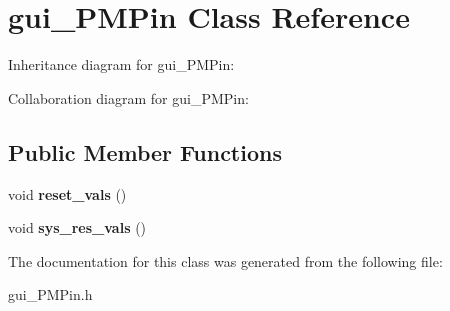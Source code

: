 \hypertarget{classgui__PMPin}{}\section{gui\+\_\+\+P\+M\+Pin Class Reference}
\label{classgui__PMPin}


Inheritance diagram for gui\+\_\+\+P\+M\+Pin\+:


Collaboration diagram for gui\+\_\+\+P\+M\+Pin\+:
\subsection*{Public Member Functions}
\begin{DoxyCompactItemize}
\item 
void {\bfseries reset\+\_\+vals} ()\hypertarget{classgui__PMPin_acb6cd63b4650c93e8b434f1ea4303b6a}{}\label{classgui__PMPin_acb6cd63b4650c93e8b434f1ea4303b6a}

\item 
void {\bfseries sys\+\_\+res\+\_\+vals} ()\hypertarget{classgui__PMPin_a2299d588ef47427299d899e71edd5268}{}\label{classgui__PMPin_a2299d588ef47427299d899e71edd5268}

\end{DoxyCompactItemize}


The documentation for this class was generated from the following file\+:\begin{DoxyCompactItemize}
\item 
gui\+\_\+\+P\+M\+Pin.\+h\end{DoxyCompactItemize}
